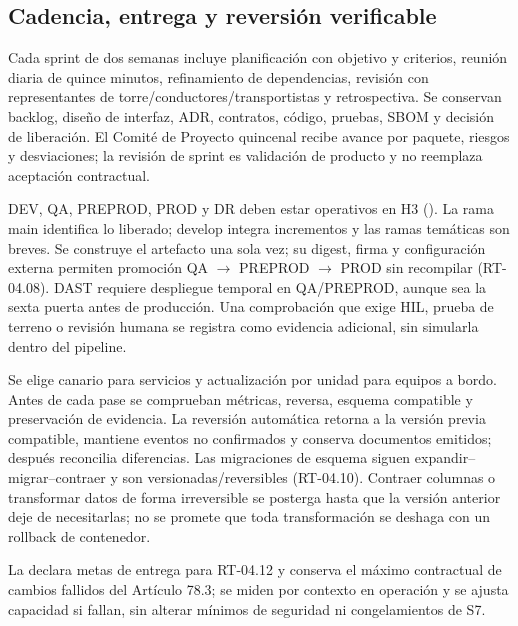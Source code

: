 \FloatBarrier
\subsection{Cadencia, entrega y reversión verificable}\label{sec:06-cadencia-entrega-y-reversion-verificable}

Cada sprint de dos semanas incluye planificación con objetivo y criterios, reunión diaria de quince minutos, refinamiento de dependencias, revisión con representantes de torre/conductores/transportistas y retrospectiva. Se conservan backlog, diseño de interfaz, ADR, contratos, código, pruebas, SBOM y decisión de liberación. El Comité de Proyecto quincenal recibe avance por paquete, riesgos y desviaciones; la revisión de sprint es validación de producto y no reemplaza aceptación contractual.

DEV, QA, PREPROD, PROD y DR deben estar operativos en H3 (). La rama main identifica lo liberado; develop integra incrementos y las ramas temáticas son breves. Se construye el artefacto una sola vez; su digest, firma y configuración externa permiten promoción QA $\rightarrow$ PREPROD $\rightarrow$ PROD sin recompilar (RT-04.08). DAST requiere despliegue temporal en QA/PREPROD, aunque sea la sexta puerta antes de producción. Una comprobación que exige HIL, prueba de terreno o revisión humana se registra como evidencia adicional, sin simularla dentro del pipeline.

Se elige canario para servicios y actualización por unidad para equipos a bordo. Antes de cada pase se comprueban métricas, reversa, esquema compatible y preservación de evidencia. La reversión automática retorna a la versión previa compatible, mantiene eventos no confirmados y conserva documentos emitidos; después reconcilia diferencias. Las migraciones de esquema siguen expandir–migrar–contraer y son versionadas/reversibles (RT-04.10). Contraer columnas o transformar datos de forma irreversible se posterga hasta que la versión anterior deje de necesitarlas; no se promete que toda transformación se deshaga con un rollback de contenedor.

La  declara metas de entrega para RT-04.12 y conserva el máximo contractual de cambios fallidos del Artículo 78.3; se miden por contexto en operación y se ajusta capacidad si fallan, sin alterar mínimos de seguridad ni congelamientos de S7.

